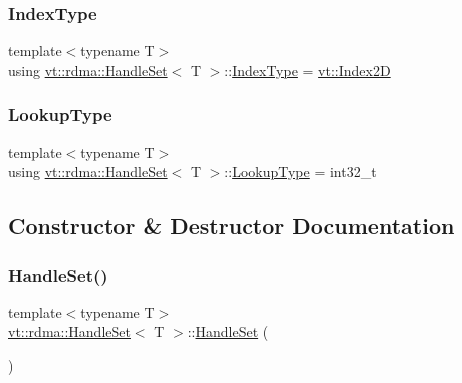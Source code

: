 \subsubsection{\texorpdfstring{Index\+Type}{IndexType}}
{\footnotesize\ttfamily template$<$typename T$>$ \\
using \hyperlink{structvt_1_1rdma_1_1_handle_set}{vt\+::rdma\+::\+Handle\+Set}$<$ T $>$\+::\hyperlink{structvt_1_1rdma_1_1_handle_set_aa0dbb6a47c459fb4290f0ca96e573097}{Index\+Type} =  \hyperlink{namespacevt_a3bab786053b74a3d856fff1412ffa73a}{vt\+::\+Index2D}}

\mbox{\label{structvt_1_1rdma_1_1_handle_set_a81d333ec397f0becb9fe692e53145441}} 
\subsubsection{\texorpdfstring{Lookup\+Type}{LookupType}}
{\footnotesize\ttfamily template$<$typename T$>$ \\
using \hyperlink{structvt_1_1rdma_1_1_handle_set}{vt\+::rdma\+::\+Handle\+Set}$<$ T $>$\+::\hyperlink{structvt_1_1rdma_1_1_handle_set_a81d333ec397f0becb9fe692e53145441}{Lookup\+Type} =  int32\+\_\+t}



\subsection{Constructor \& Destructor Documentation}
\mbox{\label{structvt_1_1rdma_1_1_handle_set_a61565fe70c627c3fb0f68b3585610587}} 
\subsubsection{\texorpdfstring{Handle\+Set()}{HandleSet()}\hspace{0.1cm}{\footnotesize\ttfamily [1/4]}}
{\footnotesize\ttfamily template$<$typename T$>$ \\
\hyperlink{structvt_1_1rdma_1_1_handle_set}{vt\+::rdma\+::\+Handle\+Set}$<$ T $>$\+::\hyperlink{structvt_1_1rdma_1_1_handle_set}{Handle\+Set} (\begin{DoxyParamCaption}{ }\end{DoxyParamCaption})\hspace{0.3cm}{\ttfamily [default]}}

